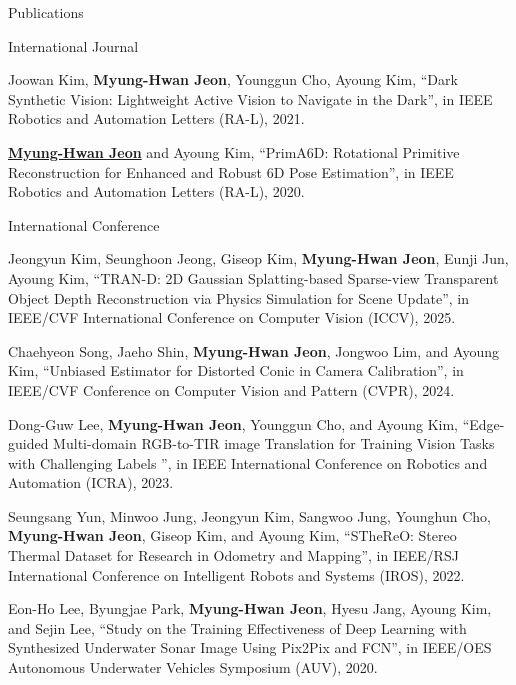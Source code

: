 \begin{rSection}{Publications}
\begin{pubSubsection}{International Journal}
  \item Joowan Kim, \textbf{Myung-Hwan Jeon}, Younggun Cho, Ayoung Kim, “Dark Synthetic Vision: Lightweight Active Vision to Navigate in the Dark”, in IEEE Robotics and Automation Letters (RA-L), 2021.%
  
  \item \underline{\textbf{Myung-Hwan Jeon}} and Ayoung Kim, “PrimA6D: Rotational Primitive Reconstruction for Enhanced and Robust 6D Pose Estimation”, in IEEE Robotics and Automation Letters (RA-L), 2020.%

\end{pubSubsection}

\begin{pubSubsection}{International Conference}

  \item Jeongyun Kim, Seunghoon Jeong, Giseop Kim, \textbf{Myung-Hwan Jeon}, Eunji Jun, Ayoung Kim, “TRAN-D: 2D Gaussian Splatting-based Sparse-view Transparent Object Depth Reconstruction via Physics Simulation for Scene Update”, in IEEE/CVF International Conference on Computer Vision (ICCV), 2025.

  \item Chaehyeon Song, Jaeho Shin, \textbf{Myung-Hwan Jeon}, Jongwoo Lim, and Ayoung Kim, “Unbiased Estimator for Distorted Conic in Camera Calibration”, in IEEE/CVF Conference on Computer Vision and Pattern (CVPR), 2024.%

  \item Dong-Guw Lee, \textbf{Myung-Hwan Jeon}, Younggun Cho, and Ayoung Kim, “Edge-guided Multi-domain RGB-to-TIR image Translation for Training Vision Tasks with Challenging Labels ”, in IEEE International Conference on Robotics and Automation (ICRA), 2023.%

  \item Seungsang Yun, Minwoo Jung, Jeongyun Kim, Sangwoo Jung, Younghun Cho, \textbf{Myung-Hwan Jeon}, Giseop Kim, and Ayoung Kim, “STheReO: Stereo Thermal Dataset for Research in Odometry and Mapping”, in IEEE/RSJ International Conference on Intelligent Robots and Systems (IROS), 2022.%
  
  \item Eon-Ho Lee, Byungjae Park, \textbf{Myung-Hwan Jeon}, Hyesu Jang, Ayoung Kim, and Sejin Lee, “Study on the Training Effectiveness of Deep Learning with Synthesized Underwater Sonar Image Using Pix2Pix and FCN”, in IEEE/OES Autonomous Underwater Vehicles Symposium (AUV), 2020.
  

\end{pubSubsection}
\end{rSection}

